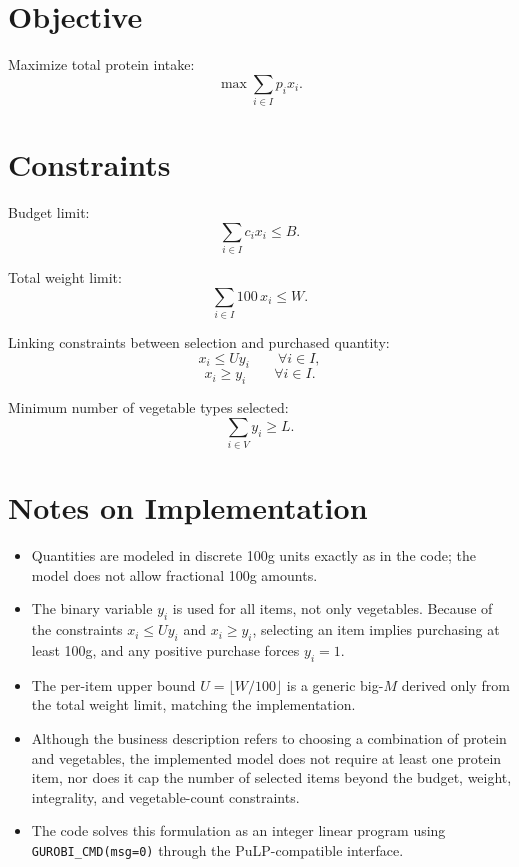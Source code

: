 \section*{Objective}

Maximize total protein intake:
\[
\max \sum_{i \in I} p_i x_i.
\]

\section*{Constraints}

Budget limit:
\[
\sum_{i \in I} c_i x_i \le B.
\]

Total weight limit:
\[
\sum_{i \in I} 100\,x_i \le W.
\]

Linking constraints between selection and purchased quantity:
\[
x_i \le U y_i \qquad \forall i \in I,
\]
\[
x_i \ge y_i \qquad \forall i \in I.
\]

Minimum number of vegetable types selected:
\[
\sum_{i \in V} y_i \ge L.
\]

\section*{Notes on Implementation}

\begin{itemize}
    \item Quantities are modeled in discrete 100g units exactly as in the code; the model does not allow fractional 100g amounts.
    \item The binary variable $y_i$ is used for all items, not only vegetables. Because of the constraints $x_i \le U y_i$ and $x_i \ge y_i$, selecting an item implies purchasing at least 100g, and any positive purchase forces $y_i=1$.
    \item The per-item upper bound $U=\lfloor W/100 \rfloor$ is a generic big-$M$ derived only from the total weight limit, matching the implementation.
    \item Although the business description refers to choosing a combination of protein and vegetables, the implemented model does not require at least one protein item, nor does it cap the number of selected items beyond the budget, weight, integrality, and vegetable-count constraints.
    \item The code solves this formulation as an integer linear program using \texttt{GUROBI\_CMD(msg=0)} through the PuLP-compatible interface.
\end{itemize}
